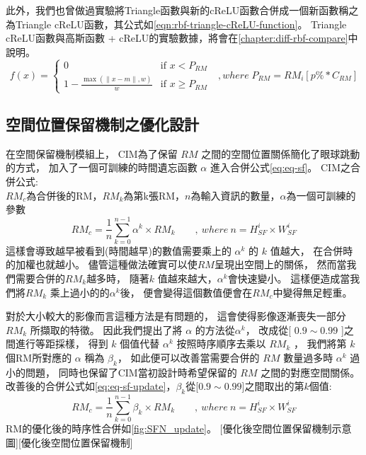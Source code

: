 \documentclass[class=NCU_thesis, crop=false]{standalone}
\begin{document}
	 \pagebreak
	此外，我們也曾做過實驗將Triangle函數與新的cReLU函數合併成一個新函數稱之為Triangle cReLU函數，其公式如\cref{eqn:rbf-triangle-cReLU-function}。
	Triangle cReLU函數與高斯函數 + cReLU的實驗數據，將會在\cref{chapter:diff-rbf-compare}中說明。
	\begin{equation}
      \label{eqn:rbf-triangle-cReLU-function}
      f(x)= 
      \begin{cases}
	        0 & \text{if  $x < P_{RM}$ }\\
	        1 - \frac{ \max \left( \| x-m \|, w \right)}{w} & \text{if  $x \geq P_{RM}$}
	   \end{cases}, where \; P_{RM} = RM_{i}\left[ p\% * C_{RM} \right]
  	\end{equation}
	

	\pagebreak

	\subsection{空間位置保留機制之優化設計}
	在空間保留機制模組上，
	CIM為了保留 $RM$ 之間的空間位置關係簡化了眼球跳動的方式，
	加入了一個可訓練的時間遺忘函數 $\alpha$ 進入合併公式\cref{eq:eq-sf}。
	CIM之合併公式:\cite{YangCNNInterpretable}\\
		$RM_{c}$為合併後的RM，$RM_{k}$為第k張RM，$n$為輸入資訊的數量，$\alpha$為一個可訓練的參數
		\begin{equation}
		    \label{eq:eq-sf}
		    RM_{c}=\frac{1}{n} \sum_{k = 0}^{n-1} \alpha^{k} \times RM_{k}  \qquad ,\ where\ n = \textit{H}^{i}_{SF} \times \textit{W}^{i}_{SF}
		\end{equation}
	這樣會導致越早被看到(時間越早)的數值需要乘上的 $\alpha^{k}$ 的 $k$ 值越大，
	在合併時的加權也就越小。
	儘管這種做法確實可以使$RM$呈現出空間上的關係，
	然而當我們需要合併的$RM_{k}$越多時，
	隨著$k$ 值越來越大，$\alpha^{k}$會快速變小。
	這樣便造成當我們將$RM_{k}$ 乘上過小的的$\alpha^{k}$後，
	便會變得這個數值便會在$RM_{c}$中變得無足輕重。

	對於大小較大的影像而言這種方法是有問題的，
	這會使得影像逐漸喪失一部分$ RM_{k} $ 所擷取的特徵。
	因此我們提出了將 $\alpha$ 的方法從$\alpha^{k}$，
	改成從[ $0.9 \sim 0.99$ ]之間進行等距採樣，
	得到 $k$ 個值代替 $\alpha^{k}$ 按照時序順序去乘以 $RM_{k}$ ，
	我們將第 $k$ 個RM所對應的 $\alpha$ 稱為 $\beta_{k}$，
	如此便可以改善當需要合併的 $RM$ 數量過多時 $\alpha^{k}$ 過小的問題，
	同時也保留了CIM當初設計時希望保留的 $RM$ 之間的對應空間關係。\\
	改善後的合併公式如\cref{eq:eq-sf-update}，$\beta_{k}$從[$0.9 \sim 0.99$]之間取出的第$k$個值:\\
		\begin{equation}
		    \label{eq:eq-sf-update}
		    RM_{c}=\frac{1}{n} \sum_{k = 0}^{n-1} \beta_{k} \times RM_{k}  \qquad ,\ where\ n = \textit{H}^{i}_{SF} \times \textit{W}^{i}_{SF}
		\end{equation}
	RM的優化後的時序性合併如\cref{fig:SFN_update}。
	[優化後空間位置保留機制示意圖][優化後空間位置保留機制]
\end{document}
